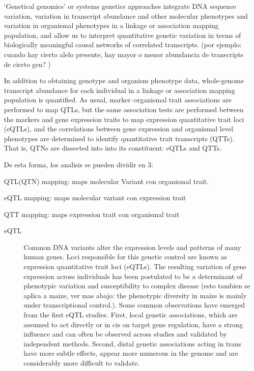 \documentclass[a4paper,10pt]{article}
\begin{document}
\begin{description}
‘Genetical genomics’ or systems genetics approaches integrate DNA sequence variation, variation in transcript abundance and other molecular phenotypes and variation in organismal phenotypes in a linkage or association mapping population, and allow us to interpret quantitative genetic variation in terms of
biologically meaningful causal networks of correlated transcripts.
(por ejemplo: cuando hay cierto alelo presente, hay mayor o menor abundancia de transcripts de cierto gen? )


In addition to obtaining genotype and organism phenotype data, whole-genome transcript abundance for each individual in a linkage or association mapping population is quantified. 
As usual, marker–organismal trait associations are performed to map QTLs, but the same association tests are performed between the markers and gene expression traits to map expression quantitative trait loci (eQTLs), and
the correlations between gene expression and organismal level phenotypes are determined to identify quantitative  trait transcripts (QTTs).
That is, QTNs are dissected into into its constituent: eQTLs and QTTs.

De esta forma, los analisis se pueden dividir en 3:
\begin{description}
 \item QTL(QTN) mapping: maps molecular Variant con organismal trait. 
 \item eQTL mapping:  maps molecular variant con expression trait
  \item QTT mapping: maps expression trait con organismal trait 
\end{description}



\begin{description}
 \item [eQTL] Common DNA variants alter the expression levels and patterns of many human genes. 
Loci responsible for this genetic control are known as expression quantitative trait loci (eQTLs). 
The resulting variation of gene expression across individuals has been postulated to be a determinant of phenotypic variation and susceptibility to complex disease (esto tambien se aplica a maize, ver mas abajo: the phenotypic diversity in maize is mainly under transcriptional control.).
Some common observations have emerged from the first eQTL studies. First, local genetic associations, which are assumed to act directly or in cis on target gene regulation, have a strong influence and can often be observed across studies and validated by independent methods. 
Second, distal genetic associations acting in trans have more subtle effects, appear more numerous in the genome and are considerably more difficult to validate.


\end{description}
\end{description}
\end{document}
